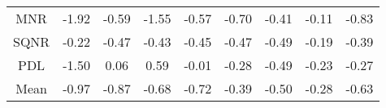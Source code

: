 \documentclass[11pt,a4paper]{report}
\begin{document}
\begin{longtable}{ | c || c | c | c | c | c | c | c || c |}
MNR &  \cellcolor[HTML]{FFCFCF} -1.92 &  \cellcolor[HTML]{FFEFEF} -0.59 &  \cellcolor[HTML]{FFD7D7} -1.55 &  \cellcolor[HTML]{FFEFEF} -0.57 &  \cellcolor[HTML]{FFEFEF} -0.70 &  \cellcolor[HTML]{FFF7F7} -0.41 &  \cellcolor[HTML]{FFFFFF} -0.11 &  \cellcolor[HTML]{FFE7E7} -0.83 \\
SQNR &  \cellcolor[HTML]{FFF7F7} -0.22 &  \cellcolor[HTML]{FFF7F7} -0.47 &  \cellcolor[HTML]{FFF7F7} -0.43 &  \cellcolor[HTML]{FFF7F7} -0.45 &  \cellcolor[HTML]{FFF7F7} -0.47 &  \cellcolor[HTML]{FFEFEF} -0.49 &  \cellcolor[HTML]{FFF7F7} -0.19 &  \cellcolor[HTML]{FFF7F7} -0.39 \\
PDL &  \cellcolor[HTML]{FFD7D7} -1.50 &  \cellcolor[HTML]{FFFFFF} 0.06 &  \cellcolor[HTML]{EFEFFF} 0.59 &  \cellcolor[HTML]{FFFFFF} -0.01 &  \cellcolor[HTML]{FFF7F7} -0.28 &  \cellcolor[HTML]{FFEFEF} -0.49 &  \cellcolor[HTML]{FFF7F7} -0.23 &  \cellcolor[HTML]{FFF7F7} -0.27 \\
\hline
\hline
Mean  &  \cellcolor[HTML]{FFE7E7} -0.97 &  \cellcolor[HTML]{FFE7E7} -0.87 &  \cellcolor[HTML]{FFEFEF} -0.68 &  \cellcolor[HTML]{FFEFEF} -0.72 &  \cellcolor[HTML]{FFF7F7} -0.39 &  \cellcolor[HTML]{FFEFEF} -0.50 &  \cellcolor[HTML]{FFF7F7} -0.28 &  \cellcolor[HTML]{FFEFEF} -0.63 \\
\hline
\end{longtable}
\end{document}
